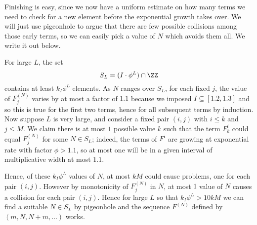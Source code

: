 \documentclass[11pt]{scrartcl}
\begin{document}
Finishing is easy, since we now have a uniform estimate on how many
terms we need to check for a new element before the exponential growth
takes over. We will just use pigeonhole to argue that there are few
possible collisions among those early terms, so we can easily pick a
value of $N$ which avoids them all. We write it out below.

For large $L$, the set \[S_L=(I\cdot \phi^L)\cap\ZZ\] contains at
least $k_I\phi^L$ elements. As $N$ ranges over $S_L$, for each fixed
$j$, the value of $F^{(N)}_j$ varies by at most a factor of $1.1$
because we imposed $I\subseteq [1.2,1.3]$ and so this is true for the
first two terms, hence for all subsequent terms by induction. Now
suppose $L$ is very large, and consider a fixed pair $(i,j)$ with $i\leq
k$ and $j\leq M$. We claim there is at most $1$ possible value $k$ such
that the term $F^i_k$ could equal $F^{(N)}_j$ for some $N\in S_L$;
indeed, the terms of $F^i$ are growing at exponential rate with factor
$\phi>1.1$, so at most one will be in a given interval of multiplicative
width at most $1.1$.

Hence, of these $k_I\phi^L$ values of $N$, at most $kM$ could cause
problems, one for each pair $(i,j)$. However by monotonicity of
$F^{(N)}_j$ in $N$, at most $1$ value of $N$ causes a collision for each
pair $(i,j)$. Hence for large $L$ so that $k_I\phi^L>10kM$ we can find a
suitable $N\in S_L$ by pigeonhole and the sequence $F^{(N)}$ defined by
$(m,N,N+m,\dots)$ works.
\pagebreak
\end{document}
